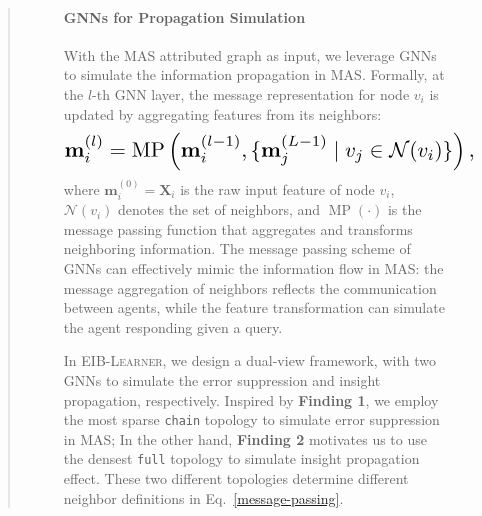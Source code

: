 \documentclass[11pt]{article}
\newcommand{\ourmethod}{\textsc{{EIB-Learner}}\xspace}
\begin{document}
\begin{abstract}
\begin{figure}[ht!]
\vspace{-7pt}
\paragraph{GNNs for Propagation Simulation}
With the MAS attributed graph as input, we leverage GNNs to simulate the information propagation in MAS. 
Formally, at the $l$-th GNN layer, the message representation for node $v_i$ is updated by aggregating features from its neighbors:
\vspace{-5pt}
\begin{equation}\label{message-passing}
\resizebox{.85\hsize}{!}{$\mathbf{m}_{i}^{(l)} = \operatorname{MP}\left (\mathbf{m}_{i}^{(l-1)},\{ \mathbf{m}_{j}^{(L-1)} \mid v_j \in \mathcal{N}(v_i) \} \right),$}
\vspace{-7pt}
\end{equation}
where $\mathbf{m}^{(0)}_i = \mathbf{X}_i$ is the raw input feature of node $v_i$, $\mathcal{N}(v_i)$ denotes the set of neighbors, and $\operatorname{MP}(\cdot)$ is the message passing function that aggregates and transforms neighboring information. The message passing scheme of GNNs can effectively mimic the information flow in MAS: the message aggregation of neighbors reflects the communication between agents, while the feature transformation can simulate the agent responding given a query. 

In \ourmethod, we design a dual-view framework, with two GNNs to simulate the error suppression and insight propagation, respectively. Inspired by \textbf{\textcolor{deepgreen}{Finding 1}}, we employ the most sparse \texttt{chain} topology to simulate error suppression in MAS; In the other hand, \textbf{\textcolor{deepgreen}{Finding 2}} motivates us to use the densest \texttt{full} topology to simulate insight propagation effect. These two different topologies determine different neighbor definitions in Eq.~\eqref{message-passing}.



\end{figure}
\end{abstract}
\end{document}
